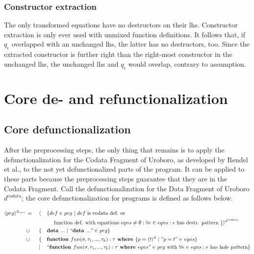 \subsubsection{Constructor extraction}

The only transformed equations have no destructors on their lhs. Constructor extraction is only ever used with unmixed function definitions. It follows that, if $q_\epsilon$ overlapped with an unchanged lhs, the latter has no destructors, too. Since the extracted constructor is further right than the right-most constructor in the unchanged lhs, the unchanged lhs and $q_\epsilon$ would overlap, contrary to assumption.

\section{Core de- and refunctionalization}

\subsection{Core defunctionalization}

After the preprocessing steps, the only thing that remains is to apply the defunctionalization for the Codata Fragment of Uroboro, as developed by Rendel et al., to the not yet defunctionalized parts of the program. It can be applied to these parts because the preprocessing steps guarantee that they are in the Codata Fragment. Call the defunctionalization for the Data Fragment of Uroboro $d^{codata}$; the core defunctionalization for programs is defined as follows below.

\begin{alignat*}{3}
\langle prg \rangle^{d_{core}} & = ~&& \langle && \{ def \in prg ~ | ~ def \textrm{ is codata def. or} \\ & && &&\quad \textrm{ function def. with equations } eqns \neq \emptyset: \forall e \in eqns: e \textrm{ has destr. pattern } \} \rangle^{d^{codata}} \\
& \cup && \{ && \textrm{\textbf{data }} ... ~ | ~ `` \textrm{\textbf{data }} ... " \in prg \} \\
& \cup && \{ && \textrm{\textbf{function }} fun(\sigma, \tau_1, ..., \tau_k): \tau \textrm{\textbf{ where }} \{ p = \langle t \rangle^d ~ | ~ "p = t" \in eqns \} \\
& && | && `` \textrm{\textbf{function }} fun(\sigma, \tau_1, ..., \tau_k): \tau \textrm{\textbf{ where }} eqns " \in prg \textrm{ with } \forall e \in eqns: e \textrm{ has hole pattern}\} 
\end{alignat*}

